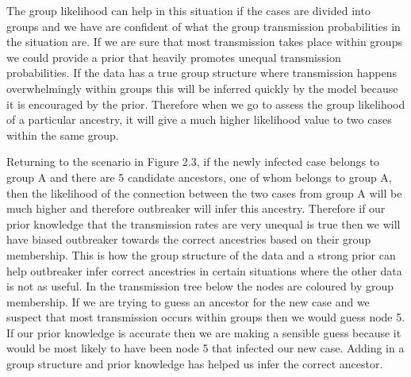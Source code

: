 \documentclass[11pt,a4paper]{report}
\begin{document}
The group likelihood can help in this situation if the cases are divided into groups and we have are confident of what the group transmission probabilities in the situation are. If we are sure that most transmission takes place within groups we could provide a prior that heavily promotes unequal transmission probabilities. If the data has a true group structure where transmission happens overwhelmingly within groups this will be inferred quickly by the model because it is encouraged by the prior. Therefore when we go to assess the group likelihood of a particular ancestry, it will give a much higher likelihood value to two cases within the same group. 

Returning to the scenario in Figure 2.3, if the newly infected case belongs to group A and there are 5 candidate ancestors, one of whom belongs to group A, then the likelihood of the connection between the two cases from group A will be much higher and therefore outbreaker will infer this ancestry. Therefore if our prior knowledge that the transmission rates are very unequal is true then we will have biased outbreaker towards the correct ancestries based on their group membership. This is how the group structure of the data and a strong prior can help outbreaker infer correct ancestries in certain situations where the other data is not as useful. In the transmission tree below the nodes are coloured by group membership. If we are trying to guess an ancestor for the new case and we suspect that most transmission occurs within groups then we would guess node 5. If our prior knowledge is accurate then we are making a sensible guess because it would be most likely to have been node 5 that infected our new case. Adding in a group structure and prior knowledge has helped us infer the correct ancestor.
\end{document}
